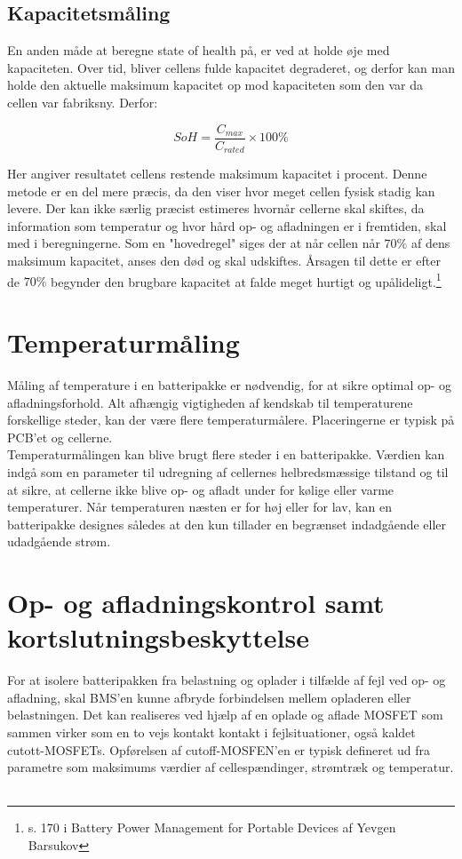 \subsection{Kapacitetsmåling}
En anden måde at beregne state of health på, er ved at holde øje med kapaciteten. Over tid, bliver cellens fulde kapacitet degraderet, og derfor kan man holde den aktuelle maksimum kapacitet op mod kapaciteten som den var da cellen var fabriksny. Derfor: 

\begin {equation} 
SoH = \frac{C_{max}}{C_{rated}}\times 100\percent \label{eq:soh_capacity}
\end {equation}

Her angiver resultatet cellens restende maksimum kapacitet i procent. Denne metode er en del mere præcis, da den viser hvor meget cellen fysisk stadig kan levere. Der kan ikke særlig præcist estimeres hvornår cellerne skal skiftes, da information som temperatur og hvor hård op- og afladningen er i fremtiden, skal med i beregningerne. Som en "hovedregel" \space siges der at når cellen når $70\percent$ af dens maksimum kapacitet, anses den død og skal udskiftes. Årsagen til dette er efter de $70\percent$ begynder den brugbare kapacitet at falde meget hurtigt og upålideligt.\footnote{s. 170 i Battery Power Management for Portable Devices af Yevgen Barsukov}

\section{Temperaturmåling}
Måling af temperature i en batteripakke er nødvendig, for at sikre optimal op- og afladningsforhold. Alt afhængig vigtigheden af kendskab til temperaturene forskellige steder, kan der være flere temperaturmålere. Placeringerne er typisk på PCB'et og cellerne.
\\

Temperaturmålingen kan blive brugt flere steder i en batteripakke. Værdien kan indgå som en parameter til udregning af cellernes helbredsmæssige tilstand og til at sikre, at cellerne ikke blive op- og afladt under for kølige eller varme temperaturer. Når temperaturen næsten er for høj eller for lav, kan en batteripakke designes således at den kun tillader en begrænset indadgående eller udadgående strøm.

\section{Op- og afladningskontrol samt kortslutningsbeskyttelse}
For at isolere batteripakken fra belastning og oplader i tilfælde af fejl ved op- og afladning, skal BMS'en kunne afbryde forbindelsen mellem opladeren eller belastningen. Det kan realiseres ved hjælp af en oplade og aflade MOSFET som sammen virker som en to vejs kontakt kontakt i fejlsituationer, også kaldet cutott-MOSFETs. Opførelsen af cutoff-MOSFEN'en er typisk defineret ud fra parametre som maksimums værdier af cellespændinger, strømtræk og temperatur. 
\
